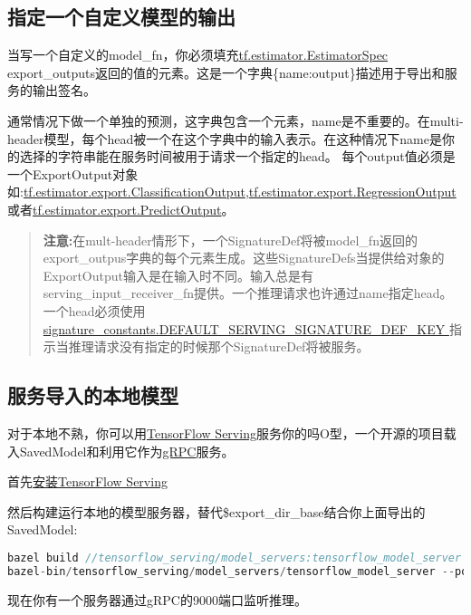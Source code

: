 \subsection{指定一个自定义模型的输出}
当写一个自定义的model\_fn，你必须填充\href{https://www.tensorflow.org/api_docs/python/tf/estimator/EstimatorSpec?hl=zh-cn}{tf.estimator.EstimatorSpec }export\_outputs返回的值的元素。这是一个字典\{name:output\}描述用于导出和服务的输出签名。

通常情况下做一个单独的预测，这字典包含一个元素，name是不重要的。在multi-header模型，每个head被一个在这个字典中的输入表示。在这种情况下name是你的选择的字符串能在服务时间被用于请求一个指定的head。
每个output值必须是一个ExportOutput对象如:\href{https://www.tensorflow.org/api_docs/python/tf/estimator/export/ClassificationOutput?hl=zh-cn}{tf.estimator.export.ClassificationOutput},\href{https://www.tensorflow.org/api_docs/python/tf/estimator/export/RegressionOutput?hl=zh-cn}{tf.estimator.export.RegressionOutput}或者\href{https://www.tensorflow.org/api_docs/python/tf/estimator/export/PredictOutput?hl=zh-cn}{tf.estimator.export.PredictOutput}。
\begin{quote}
\textbf{注意:}在mult-header情形下，一个SignatureDef将被model\_fn返回的export\_outpus字典的每个元素生成。这些SignatureDefs当提供给对象的ExportOutput输入是在输入时不同。输入总是有serving\_input\_receiver\_fn提供。一个推理请求也许通过name指定head。一个head必须使用\href{https://www.github.com/tensorflow/tensorflow/blob/r1.4/tensorflow/python/saved_model/signature_constants.py}{signature\_constants.DEFAULT\_SERVING\_SIGNATURE\_DEF\_KEY }指示当推理请求没有指定的时候那个SignatureDef将被服务。
\end{quote}
\subsection{服务导入的本地模型}
对于本地不熟，你可以用\href{http://github.com/tensorflow/serving}{TensorFlow Serving}服务你的吗O型，一个开源的项目载入SavedModel和利用它作为\href{http://www.grpc.io/}{gRPC}服务。

首先\href{http://github.com/tensorflow/serving}{安装TensorFlow Serving}

然后构建运行本地的模型服务器，替代\$export\_dir\_base结合你上面导出的SavedModel:
\begin{lstlisting}[language=C++]
bazel build //tensorflow_serving/model_servers:tensorflow_model_server
bazel-bin/tensorflow_serving/model_servers/tensorflow_model_server --port=9000 --model_base_path=$export_dir_base 
\end{lstlisting}
现在你有一个服务器通过gRPC的9000端口监听推理。
